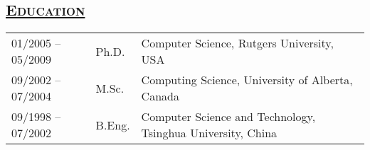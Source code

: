 \documentclass[10pt,twoside,letterpaper]{article}
\newcommand{\tabrowsep}{\vspace{1mm}}
\begin{document}
\subsection*{\textsc{\underline{Education}}}

\begin{center}
\begin{tabular}{p{30mm} p{15mm} p{115mm}}
01/2005 -- 05/2009 & Ph.D. & Computer Science, Rutgers University, USA \\
09/2002 -- 07/2004 & M.Sc. & Computing Science, University of Alberta, Canada \\
09/1998 -- 07/2002 & B.Eng. & Computer Science and Technology, Tsinghua University, China %
\end{tabular}
\end{center}
\end{document}
